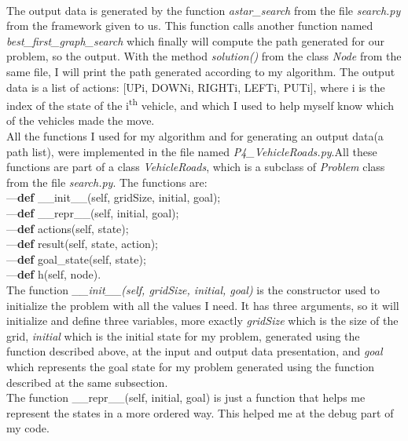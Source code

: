 \documentclass[14pt]{article}
\begin{document}
\vspace{2.5 mm}
\\The output data is generated by the function \textit{astar\_search} from the file \textit{search.py} from the framework given to us. This function calls another function named \textit{best\_first\_graph\_search} which finally will compute the path generated for our problem, so the output. With the method \textit{solution()} from the class \textit{Node} from the same file, I will print the path generated according to my algorithm. The output data is a list of actions: [UPi, DOWNi, RIGHTi, LEFTi, PUTi], where i is the index of the state of the i\textsuperscript{th} vehicle, and which I used to help myself know which of the vehicles made the move.
\vspace{2.5 mm}
\\All the functions I used for my algorithm and for generating an output data(a path list), were implemented in the file named \textit{P4\_VehicleRoads.py}.All these functions are part of a class \textit{VehicleRoads}, which is a subclass of \textit{Problem} class from the file \textit{search.py}. The functions are:
\\---\textbf{def} \_\_init\_\_(self, gridSize, initial, goal);
\\---\textbf{def} \_\_repr\_\_(self, initial, goal);
\\---\textbf{def} actions(self, state);
\\---\textbf{def} result(self, state, action);
\\---\textbf{def} goal\_state(self, state);
\\---\textbf{def} h(self, node).
\vspace{2.5 mm}
\\The function \textit{\_\_init\_\_(self, gridSize, initial, goal)} is the constructor used to initialize the problem with all the values I need. It has three arguments, so it will initialize and define three variables, more exactly \textit{gridSize} which is the size of the grid, \textit{initial} which is the initial state for my problem, generated using the function described above, at the input and output data presentation, and \textit{goal} which represents the goal state for my problem generated using the function described at the same subsection.
\vspace{2.5 mm}
\\The function \_\_repr\_\_(self, initial, goal) is just a function that helps me represent the states in a more ordered way. This helped me at the debug part of my code.
\end{document}
